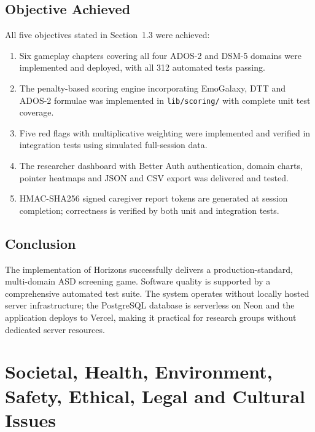 \documentclass[12pt,a4paper,oneside]{report}
\begin{document}
\section{Objective Achieved}

All five objectives stated in Section~1.3 were achieved:

\begin{enumerate}[leftmargin=0.5in, label=\arabic*.]
  \item Six gameplay chapters covering all four ADOS-2 and DSM-5 domains were implemented and deployed, with all 312 automated tests passing.
  \item The penalty-based scoring engine incorporating EmoGalaxy, DTT and ADOS-2 formulae was implemented in \texttt{lib/scoring/} with complete unit test coverage.
  \item Five red flags with multiplicative weighting were implemented and verified in integration tests using simulated full-session data.
  \item The researcher dashboard with Better Auth authentication, domain charts, pointer heatmaps and JSON and CSV export was delivered and tested.
  \item HMAC-SHA256 signed caregiver report tokens are generated at session completion; correctness is verified by both unit and integration tests.
\end{enumerate}

\section{Conclusion}

The implementation of Horizons successfully delivers a production-standard, multi-domain ASD screening game. Software quality is supported by a comprehensive automated test suite. The system operates without locally hosted server infrastructure; the PostgreSQL database is serverless on Neon and the application deploys to Vercel, making it practical for research groups without dedicated server resources.

\clearpage
\chapter{Societal, Health, Environment, Safety, Ethical, Legal and Cultural Issues}
\end{document}
